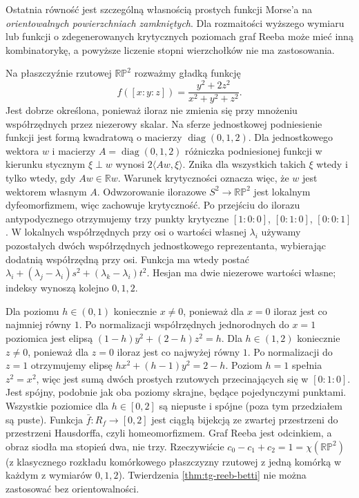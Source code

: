 \begin{uwaga}
Ostatnia równość jest szczególną własnością prostych
funkcji Morse'a na \emph{orientowalnych powierzchniach
zamkniętych}. Dla rozmaitości wyższego wymiaru
lub funkcji o zdegenerowanych krytycznych poziomach
graf Reeba może mieć inną kombinatorykę, a powyższe
liczenie stopni wierzchołków nie ma zastosowania.
\end{uwaga}

\begin{przyklad}
Na płaszczyźnie rzutowej $\mathbb{RP}^2$ rozważmy
gładką funkcję
\[
 f([x:y:z])=\frac{y^2+2z^2}{x^2+y^2+z^2}.
\]
Jest dobrze określona, ponieważ iloraz nie zmienia
się przy mnożeniu współrzędnych przez niezerowy skalar.
Na sferze jednostkowej podniesienie funkcji jest formą
kwadratową o macierzy $\operatorname{diag}(0,1,2)$.
Dla jednostkowego wektora $w$ i macierzy
$A=\operatorname{diag}(0,1,2)$ różniczka podniesionej
funkcji w kierunku stycznym $\xi\perp w$ wynosi
$2\langle Aw,\xi\rangle$. Znika dla wszystkich takich
$\xi$ wtedy i tylko wtedy, gdy $Aw\in\mathbb R w$.
Warunek krytyczności oznacza więc, że $w$ jest
wektorem własnym $A$. Odwzorowanie ilorazowe
$S^2\to\mathbb{RP}^2$ jest lokalnym dyfeomorfizmem,
więc zachowuje krytyczność. Po przejściu
do ilorazu antypodycznego otrzymujemy trzy punkty
krytyczne $[1:0:0]$, $[0:1:0]$, $[0:0:1]$.
W lokalnych współrzędnych przy osi o wartości własnej $\lambda_i$
używamy pozostałych dwóch współrzędnych jednostkowego
reprezentanta, wybierając dodatnią współrzędną przy osi.
Funkcja ma wtedy postać
$\lambda_i+(\lambda_j-\lambda_i)s^2+
(\lambda_k-\lambda_i)t^2$. Hesjan ma dwie niezerowe
wartości własne; indeksy wynoszą kolejno $0,1,2$.

Dla poziomu $h\in(0,1)$ koniecznie $x\ne0$,
ponieważ dla $x=0$ iloraz jest co najmniej równy $1$.
Po normalizacji współrzędnych jednorodnych do $x=1$
poziomica jest elipsą
$(1-h)y^2+(2-h)z^2=h$.
Dla $h\in(1,2)$ koniecznie $z\ne0$,
ponieważ dla $z=0$ iloraz jest co najwyżej równy $1$.
Po normalizacji do $z=1$ otrzymujemy elipsę $hx^2+(h-1)y^2=2-h$.
Poziom $h=1$ spełnia $z^2=x^2$, więc jest sumą
dwóch prostych rzutowych przecinających się w
$[0:1:0]$. Jest spójny, podobnie jak oba poziomy
skrajne, będące pojedynczymi punktami.
Wszystkie poziomice dla $h\in[0,2]$ są niepuste
i spójne (poza tym przedziałem są puste).
Funkcja
$\bar f:R_f\to[0,2]$ jest ciągłą bijekcją
ze zwartej przestrzeni do przestrzeni Hausdorffa,
czyli homeomorfizmem. Graf Reeba jest odcinkiem,
a obraz siodła ma stopień dwa, nie trzy.
Rzeczywiście $c_0-c_1+c_2=1=\chi(\mathbb{RP}^2)$
(z klasycznego rozkładu komórkowego płaszczyzny
rzutowej z jedną komórką w każdym z wymiarów $0,1,2$).
Twierdzenia \ref{thm:tg-reeb-betti} nie można
zastosować bez orientowalności.
\end{przyklad}

